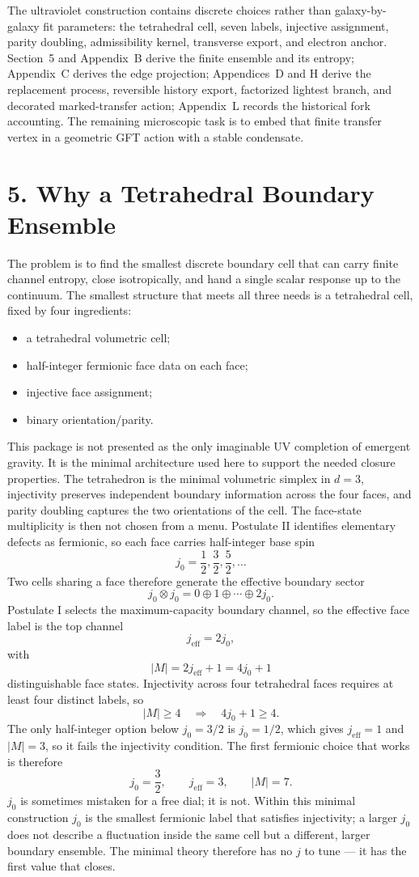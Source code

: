 \documentclass[11pt]{article}
\begin{document}
The ultraviolet construction contains discrete choices rather than galaxy-by-galaxy fit parameters: the tetrahedral cell, seven labels, injective assignment, parity doubling, admissibility kernel, transverse export, and electron anchor. Section~5 and Appendix~B derive the finite ensemble and its entropy; Appendix~C derives the edge projection; Appendices~D and H derive the replacement process, reversible history export, factorized lightest branch, and decorated marked-transfer action; Appendix~L records the historical fork accounting. The remaining microscopic task is to embed that finite transfer vertex in a geometric GFT action with a stable condensate.

\section{5. Why a Tetrahedral Boundary Ensemble}

The problem is to find the smallest discrete boundary cell that can carry finite channel entropy, close isotropically, and hand a single scalar response up to the continuum. The smallest structure that meets all three needs is a tetrahedral cell, fixed by four ingredients:
\begin{itemize}
\item a tetrahedral volumetric cell;
\item half-integer fermionic face data on each face;
\item injective face assignment;
\item binary orientation/parity.
\end{itemize}
This package is not presented as the only imaginable UV completion of emergent gravity. It is the minimal architecture used here to support the needed closure properties. The tetrahedron is the minimal volumetric simplex in $d=3$, injectivity preserves independent boundary information across the four faces, and parity doubling captures the two orientations of the cell. The face-state multiplicity is then not chosen from a menu. Postulate II identifies elementary defects as fermionic, so each face carries half-integer base spin
\[
j_0=\frac12,\frac32,\frac52,\ldots
\]
Two cells sharing a face therefore generate the effective boundary sector
\[
j_0\otimes j_0 = 0\oplus 1\oplus \cdots \oplus 2j_0.
\]
Postulate I selects the maximum-capacity boundary channel, so the effective face label is the top channel
\[
j_{\mathrm{eff}}=2j_0,
\]
with
\[
|M|=2j_{\mathrm{eff}}+1=4j_0+1
\]
distinguishable face states. Injectivity across four tetrahedral faces requires at least four distinct labels, so
\[
|M|\ge 4 \quad\Longrightarrow\quad 4j_0+1\ge 4.
\]
The only half-integer option below $j_0=3/2$ is $j_0=1/2$, which gives $j_{\mathrm{eff}}=1$ and $|M|=3$, so it fails the injectivity condition. The first fermionic choice that works is therefore
\[
j_0=\frac32,
\qquad
j_{\mathrm{eff}}=3,
\qquad
|M|=7.
\]
$j_0$ is sometimes mistaken for a free dial; it is not. Within this minimal construction $j_0$ is the smallest fermionic label that satisfies injectivity; a larger $j_0$ does not describe a fluctuation inside the same cell but a different, larger boundary ensemble. The minimal theory therefore has no $j$ to tune --- it has the first value that closes.
\end{document}
